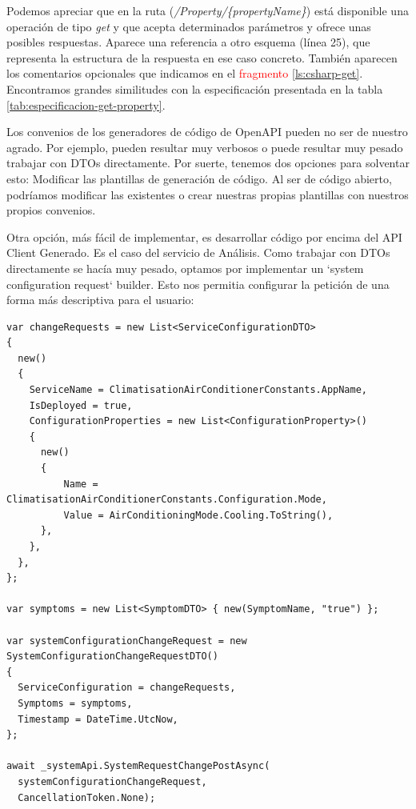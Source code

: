 Podemos apreciar que en la ruta (\emph{/Property/\{propertyName\}}) está disponible una operación de tipo \emph{get} y que acepta determinados parámetros y ofrece unas posibles respuestas. Aparece una referencia a otro esquema (línea 25), que representa la estructura de la respuesta en ese caso concreto. También aparecen los comentarios opcionales que indicamos en el \textcolor{red}{fragmento} \ref{ls:csharp-get}. Encontramos grandes similitudes con la especificación presentada en la tabla \ref{tab:especificacion-get-property}.

Los convenios de los generadores de código de OpenAPI pueden no ser de nuestro agrado. Por ejemplo, pueden resultar muy verbosos o puede resultar muy pesado trabajar con DTOs directamente. Por suerte, tenemos dos opciones para solventar esto: Modificar las plantillas de generación de código. Al ser de código abierto, podríamos modificar las existentes o crear nuestras propias plantillas con nuestros propios convenios.

Otra opción, más fácil de implementar, es desarrollar código por encima del API Client Generado. Es el caso del servicio de Análisis. Como trabajar con DTOs directamente se hacía muy pesado, optamos por implementar un `system configuration request` builder. Esto nos permitia configurar la petición de una forma más descriptiva para el usuario:

\begin{lstlisting}[language={[Sharp]C},caption={Implementación de la misma petición siguiendo el patrón \emph{builder}.},captionpos=b, label=ls:api-cliente-request-builder]
var changeRequests = new List<ServiceConfigurationDTO>
{
  new()
  {
    ServiceName = ClimatisationAirConditionerConstants.AppName,
    IsDeployed = true,
    ConfigurationProperties = new List<ConfigurationProperty>()
    {
      new()
      {
          Name = ClimatisationAirConditionerConstants.Configuration.Mode,
          Value = AirConditioningMode.Cooling.ToString(),
      },
    },
  },
};

var symptoms = new List<SymptomDTO> { new(SymptomName, "true") };

var systemConfigurationChangeRequest = new SystemConfigurationChangeRequestDTO()
{
  ServiceConfiguration = changeRequests,
  Symptoms = symptoms,
  Timestamp = DateTime.UtcNow,
};

await _systemApi.SystemRequestChangePostAsync(
  systemConfigurationChangeRequest,
  CancellationToken.None);
\end{lstlisting}


